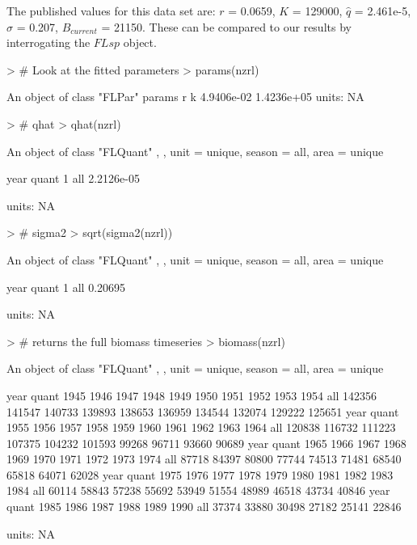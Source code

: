\documentclass[a4paper]{article}
\begin{document}
The published values for this data set are:
$r$ = 0.0659, 
$K$ = 129000, 
$\hat{q}$ = 2.461e-5, 
$\sigma$ = 0.207, 
$B_{current}$ = 21150. 
These can be compared to our results by interrogating the $FLsp$ object.
\begin{center}
\begin{minipage}[H]{0.95\textwidth}%
\begin{shaded}%
\begin{Schunk}
\begin{Sinput}
> # Look at the fitted parameters
> params(nzrl)
\end{Sinput}
\begin{Soutput}
An object of class "FLPar"
params
         r          k 
4.9406e-02 1.4236e+05 
units:  NA 
\end{Soutput}
\begin{Sinput}
> # qhat
> qhat(nzrl)
\end{Sinput}
\begin{Soutput}
An object of class "FLQuant"
, , unit = unique, season = all, area = unique

     year
quant 1         
  all 2.2126e-05

units:  NA 
\end{Soutput}
\begin{Sinput}
> # sigma2
> sqrt(sigma2(nzrl))
\end{Sinput}
\begin{Soutput}
An object of class "FLQuant"
, , unit = unique, season = all, area = unique

     year
quant 1      
  all 0.20695

units:  NA 
\end{Soutput}
\begin{Sinput}
> # returns the full biomass timeseries
> biomass(nzrl)
\end{Sinput}
\begin{Soutput}
An object of class "FLQuant"
, , unit = unique, season = all, area = unique

     year
quant 1945   1946   1947   1948   1949   1950   1951   1952   1953   1954  
  all 142356 141547 140733 139893 138653 136959 134544 132074 129222 125651
     year
quant 1955   1956   1957   1958   1959   1960   1961   1962   1963   1964  
  all 120838 116732 111223 107375 104232 101593  99268  96711  93660  90689
     year
quant 1965   1966   1967   1968   1969   1970   1971   1972   1973   1974  
  all  87718  84397  80800  77744  74513  71481  68540  65818  64071  62028
     year
quant 1975   1976   1977   1978   1979   1980   1981   1982   1983   1984  
  all  60114  58843  57238  55692  53949  51554  48989  46518  43734  40846
     year
quant 1985   1986   1987   1988   1989   1990  
  all  37374  33880  30498  27182  25141  22846

units:  NA 
\end{Soutput}
\end{Schunk}
\end{shaded}%
\end{minipage}
\end{center}
\end{document}
